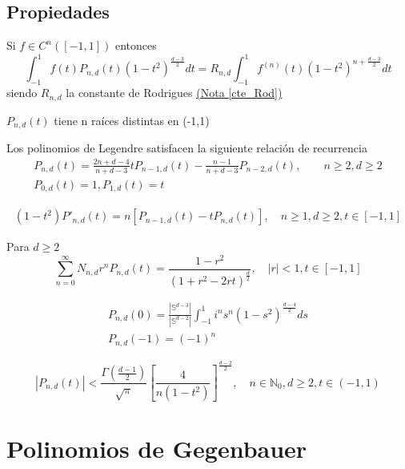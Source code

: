 \section{Propiedades}
\begin{prop}
Si $f\in C^n([-1,1])$ entonces 
$$
\int_{-1}^{1} f(t)P_{n,d}(t)(1-t^2)^{\frac{d-3}{2}} dt = R_{n,d}\int_{-1}^{1} f^{(n)}(t)(1-t^2)^{n+\frac{d-3}{2}} dt
$$
siendo $R_{n,d}$ la constante de Rodrigues \hyperref[]{(Nota \ref{cte_Rod})}
\end{prop}
\begin{prop}$P_{n,d}(t)$ tiene n raíces distintas en (-1,1)
\end{prop}
\begin{prop}Los polinomios de Legendre satisfacen la siguiente relación de recurrencia
	\begin{gather*}
		P_{n,d}(t) = \frac{2n+d-4}{n+d-3}t	P_{n-1,d}(t) - \frac{n-1}{n+d-3}P_{n-2,d}(t), \qquad n\ge 2, d\ge2 \\
		P_{0,d}(t) = 1 , 	P_{1,d}(t) = t 
	\end{gather*}
\end{prop}
\begin{prop}
	\begin{gather*}
	(1-t^2)P'_{n,d}(t) = n[P_{n-1,d}(t)-tP_{n,d}(t)], \quad n \ge 1,d \ge 2, t \in [-1,1]
	\end{gather*}
\end{prop}
\begin{prop}Para $d\ge 2$
$$\sum_{n=0}^{\infty} N_{n,d}r^nP_{n,d}(t) = \frac{1-r^2}{(1+r^2-2rt)^\frac{d}{2}},\quad |r| < 1, t\in[-1,1] 
$$
\end{prop}
\begin{prop}
	\begin{gather*}
	P_{n,d}(0) = \frac{|\mathds{S}^{d-3}|}{|\mathds{S}^{d-2}|}\int_{-1}^{1} i^n s^n(1-s^2)^{\frac{d-4}{2}}ds \\
	P_{n,d}(-1) = (-1)^n
	\end{gather*}
\end{prop}
\begin{prop}
	$$
	|P_{n,d}(t)| < \frac{\Gamma(\frac{d-1}{2})}{\sqrt{\pi}}\left[\frac{4}{n(1-t^2)}\right]^{\frac{d-2}{2}},\quad n\in\mathds{N}_0,d\ge2,t\in(-1,1)$$
\end{prop}

\chapter{Polinomios de Gegenbauer}\label{aped.D}

